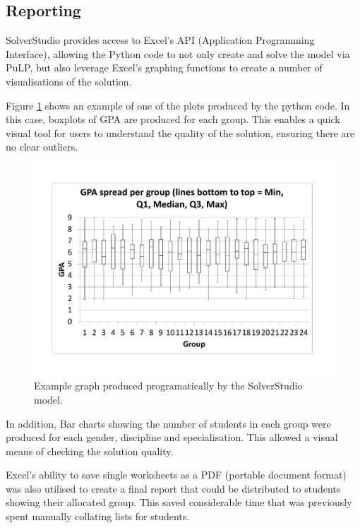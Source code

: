 \documentclass[12pt]{ORSNZ}
\begin{document}
\subsection{Reporting} \label{reporting}
SolverStudio provides access to Excel's API (Application Programming Interface), allowing the Python code to not only create and solve the model via PuLP, but also leverage Excel's graphing functions to create a number of visualisations of the solution.

Figure \ref{FIG:solverstudio_boxplot} shows an example of one of the plots produced by the python code. In this case, boxplots of GPA are produced for each group. This enables a quick visual tool for users to understand the quality of the solution, ensuring there are no clear outliers.

\begin{figure}[!ht]
	\centering
	\includegraphics[trim=50 50 50 50, clip, width=\textwidth]{solverstudio_boxplot.pdf}
	\caption{Example graph produced programatically by the SolverStudio model.}
	\label{FIG:solverstudio_boxplot}
\end{figure}

In addition, Bar charts showing the number of students in each group were produced for each gender, discipline and specialisation. This allowed a visual means of checking the solution quality. 

Excel's ability to save single worksheets as a PDF (portable document format) was also utilised to create a final report that could be distributed to students showing their allocated group. This saved considerable time that was previously spent manually collating lists for students.
\end{document}
